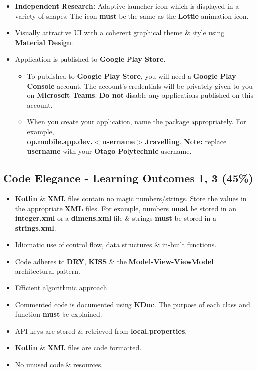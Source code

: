\documentclass{article}
\begin{document}
\begin{itemize}
	\item \textbf{Independent Research:} Adaptive launcher icon which is displayed in a variety of shapes. The icon \textbf{must} be the same as the \textbf{Lottie} animation icon.
	\item Visually attractive UI with a coherent graphical theme \& style using \textbf{Material Design}.
	\item Application is published to \textbf{Google Play Store}.
	      \begin{itemize}
		      \item To published to \textbf{Google Play Store}, you will need a \textbf{Google Play Console} account. The account's credentials will be privately given to you on \textbf{Microsoft Teams}. \textbf{Do not} disable any applications published on this account.
		      \item When you create your application, name the package appropriately. For example, \\ \textbf{op.mobile.app.dev.$<$username$>$.travelling}. \textbf{Note:} replace \textbf{username} with your \textbf{Otago Polytechnic} username.
	      \end{itemize}
\end{itemize}

\subsection*{Code Elegance - Learning Outcomes 1, 3 (45\%)}
\begin{itemize}
	\item \textbf{Kotlin} \& \textbf{XML} files contain no magic numbers/strings. Store the values in the appropriate \textbf{XML} files. For example, numbers \textbf{must} be stored in an \textbf{integer.xml} or a \textbf{dimens.xml} file \& strings \textbf{must} be stored in a \textbf{strings.xml}.
	\item Idiomatic use of control flow, data structures \& in-built functions.
	\item Code adheres to \textbf{DRY}, \textbf{KISS} \& the \textbf{Model-View-ViewModel} architectural pattern.
	\item Efficient algorithmic approach.
	\item Commented code is documented using \textbf{KDoc}. The purpose of each class and function \textbf{must} be explained.
	\item API keys are stored \& retrieved from \textbf{local.properties}.
	\item \textbf{Kotlin} \& \textbf{XML} files are code formatted.
	\item No unused code \& resources.
\end{itemize}
\end{document}

